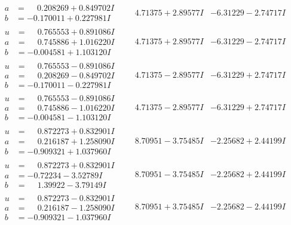 \documentclass[1p]{elsarticle_modified}
\theoremstyle{definition}
\begin{document}
$$\begin{array}{c|c|c}
\begin{aligned}
a &= \phantom{-}0.208269 + 0.849702 I \\
b &= -0.170011 + 0.227981 I\end{aligned}
 & \phantom{-}4.71375 + 2.89577 I & -6.31229 - 2.74717 I \\ \hline\begin{aligned}
u &= \phantom{-}0.765553 + 0.891086 I \\
a &= \phantom{-}0.745886 + 1.016220 I \\
b &= -0.004581 + 1.103120 I\end{aligned}
 & \phantom{-}4.71375 + 2.89577 I & -6.31229 - 2.74717 I \\ \hline\begin{aligned}
u &= \phantom{-}0.765553 - 0.891086 I \\
a &= \phantom{-}0.208269 - 0.849702 I \\
b &= -0.170011 - 0.227981 I\end{aligned}
 & \phantom{-}4.71375 - 2.89577 I & -6.31229 + 2.74717 I \\ \hline\begin{aligned}
u &= \phantom{-}0.765553 - 0.891086 I \\
a &= \phantom{-}0.745886 - 1.016220 I \\
b &= -0.004581 - 1.103120 I\end{aligned}
 & \phantom{-}4.71375 - 2.89577 I & -6.31229 + 2.74717 I \\ \hline\begin{aligned}
u &= \phantom{-}0.872273 + 0.832901 I \\
a &= \phantom{-}0.216187 + 1.258090 I \\
b &= -0.909321 + 1.037960 I\end{aligned}
 & \phantom{-}8.70951 - 3.75485 I & -2.25682 + 2.44199 I \\ \hline\begin{aligned}
u &= \phantom{-}0.872273 + 0.832901 I \\
a &= -0.72234 - 3.52789 I \\
b &= \phantom{-}1.39922 - 3.79149 I\end{aligned}
 & \phantom{-}8.70951 - 3.75485 I & -2.25682 + 2.44199 I \\ \hline\begin{aligned}
u &= \phantom{-}0.872273 - 0.832901 I \\
a &= \phantom{-}0.216187 - 1.258090 I \\
b &= -0.909321 - 1.037960 I\end{aligned}
 & \phantom{-}8.70951 + 3.75485 I & -2.25682 - 2.44199 I \\ \hline\begin{aligned}

\end{aligned}
\end{array}$$
\end{document}
